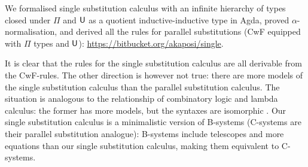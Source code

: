 \documentclass{easychair}
\begin{document}
We formalised single substitution calculus with an infinite hierarchy
of types closed under $\Pi$ and $\mathsf{U}$ as a quotient inductive-inductive
type in Agda, proved $\alpha$-normalisation, and derived all the rules
for parallel substitutions (CwF equipped with $\Pi$ types and $\mathsf{U}$):
\url{https://bitbucket.org/akaposi/single}.

It is clear that the rules for the single substitution calculus are
all derivable from the CwF-rules. The other direction is however not
true: there are more models of the single substitution calculus than
the parallel substitution calculus. The situation is analogous to the
relationship of combinatory logic and lambda calculus: the former has
more models, but the syntaxes are isomorphic
\cite{DBLP:conf/fscd/AltenkirchKSV23}. Our single substitution
calculus is a minimalistic version of B-systems
\cite{AHRENS_EMMENEGGER_NORTH_RIJKE_2023} (C-systems are their
parallel substitution analogue): B-systems include telescopes and more
equations than our single substitution calculus, making them
equivalent to C-systems.

\label{sect:bib}

%
%
%


\end{document}
